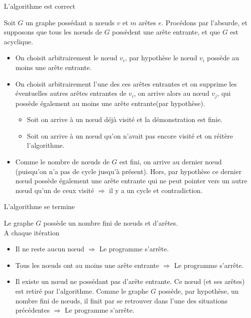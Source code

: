 \begin{frame}[allowframebreaks]{L'algorithme est correct}

Soit $G$ un graphe possédant n nœuds $v$ et $m$ arêtes $e$. Procédons par l'absurde, et supposons que tous les nœuds de $G$ possèdent une arête entrante, et que $G$ est acyclique.\\

\begin{itemize}
\item On choisit arbitrairement le nœud $v_i$, par hypothèse le nœud $v_i$ possède au moins une arête entrante. 
\item On choisit arbitrairement l'une des ces arêtes entrantes et on supprime les éventuelles autres arêtes entrantes de $v_i$, on arrive alors au nœud $v_j$, qui possède également au moins une arête entrante(par hypothèse).
\begin{itemize}
\item Soit on arrive à un nœud déjà visité et la démonstration est finie.
\item Soit on arrive à un nœud qu'on n'avait pas encore visité et on réitère l'algorithme.
\end{itemize}
\item Comme le nombre de nœuds de $G$ est fini, on arrive au dernier nœud (puisqu'on n'a pas de cycle jusqu'à présent). Hors, par hypothèse ce dernier nœud possède également une arête entrante qui ne peut pointer vers un autre nœud qu'un de ceux visité $\Rightarrow$ il y a un cycle et contradiction.
\end{itemize}

\end{frame}


\begin{frame}[allowframebreaks]{L'algorithme se termine}

Le graphe $G$ possède un nombre fini de nœuds et d'arêtes.\\

A chaque itération 
\begin{itemize}
\item Il ne reste aucun nœud $\Rightarrow$ Le programme s'arrête.
\item Tous les nœuds ont au moins une arête entrante $\Rightarrow$ Le programme s'arrête.
\item Il existe un nœud ne possédant pas d'arête entrante. Ce nœud (et ses arêtes) est retiré par l'algorithme. Comme le graphe $G$ possède, par hypothèse, un nombre fini de nœuds, il finit par se retrouver dans l'une des situations précédentes $\Rightarrow$ Le programme s'arrête.
\end{itemize} 

\end{frame}